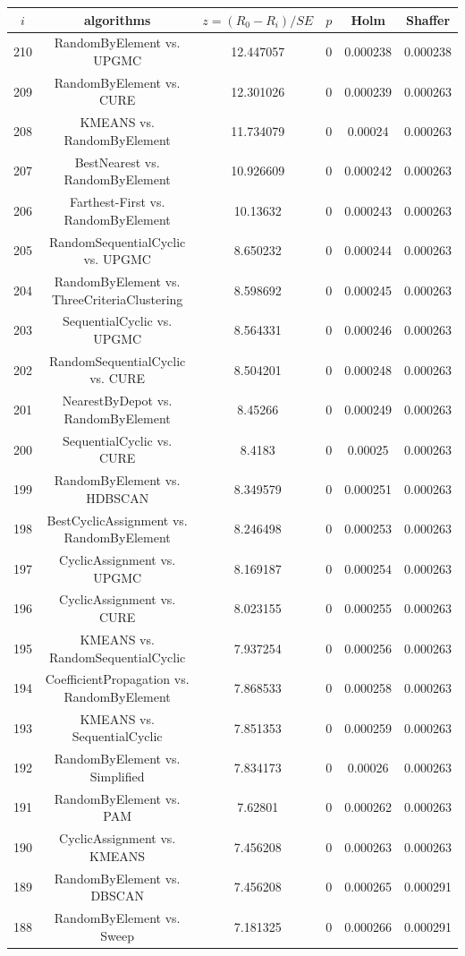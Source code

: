 \documentclass[a4paper,10pt]{article}
\begin{document}
\begin{landscape}
\begin{table}[!htp]
\centering\scriptsize
\begin{tabular}{cccccc}
$i$&algorithms&$z=(R_0 - R_i)/SE$&$p$&Holm&Shaffer\\
\hline210&RandomByElement vs. UPGMC&12.447057&0&0.000238&0.000238\\
209&RandomByElement vs. CURE&12.301026&0&0.000239&0.000263\\
208&KMEANS vs. RandomByElement&11.734079&0&0.00024&0.000263\\
207&BestNearest vs. RandomByElement&10.926609&0&0.000242&0.000263\\
206&Farthest-First vs. RandomByElement&10.13632&0&0.000243&0.000263\\
205&RandomSequentialCyclic vs. UPGMC&8.650232&0&0.000244&0.000263\\
204&RandomByElement vs. ThreeCriteriaClustering&8.598692&0&0.000245&0.000263\\
203&SequentialCyclic vs. UPGMC&8.564331&0&0.000246&0.000263\\
202&RandomSequentialCyclic vs. CURE&8.504201&0&0.000248&0.000263\\
201&NearestByDepot vs. RandomByElement&8.45266&0&0.000249&0.000263\\
200&SequentialCyclic vs. CURE&8.4183&0&0.00025&0.000263\\
199&RandomByElement vs. HDBSCAN&8.349579&0&0.000251&0.000263\\
198&BestCyclicAssignment vs. RandomByElement&8.246498&0&0.000253&0.000263\\
197&CyclicAssignment vs. UPGMC&8.169187&0&0.000254&0.000263\\
196&CyclicAssignment vs. CURE&8.023155&0&0.000255&0.000263\\
195&KMEANS vs. RandomSequentialCyclic&7.937254&0&0.000256&0.000263\\
194&CoefficientPropagation vs. RandomByElement&7.868533&0&0.000258&0.000263\\
193&KMEANS vs. SequentialCyclic&7.851353&0&0.000259&0.000263\\
192&RandomByElement vs. Simplified&7.834173&0&0.00026&0.000263\\
191&RandomByElement vs. PAM&7.62801&0&0.000262&0.000263\\
190&CyclicAssignment vs. KMEANS&7.456208&0&0.000263&0.000263\\
189&RandomByElement vs. DBSCAN&7.456208&0&0.000265&0.000291\\
188&RandomByElement vs. Sweep&7.181325&0&0.000266&0.000291\\

\end{tabular}
\end{table}
\end{landscape}
\end{document}
